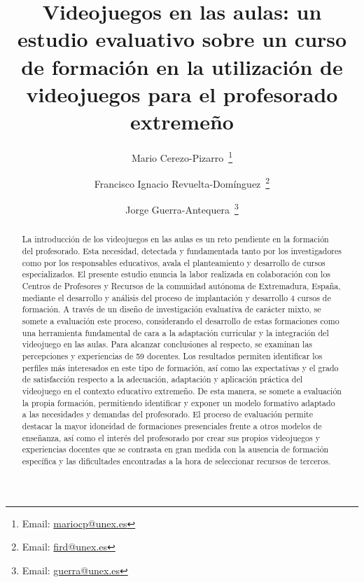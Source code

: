 \documentclass[spanish]{textolivre}
\title{Videojuegos en las aulas: un estudio evaluativo sobre un curso de formación en la utilización de videojuegos para el profesorado extremeño}
\author[1]{Mario Cerezo-Pizarro~\orcid{0000-0001-8097-0573}\thanks{Email: \href{mailto:mariocp@unex.es}{mariocp@unex.es}}}
\author[1]{Francisco Ignacio Revuelta-Domínguez~\orcid{0000-0002-3649-4327}\thanks{Email: \href{mailto:fird@unex.es}{fird@unex.es}}}
\author[1]{Jorge Guerra-Antequera~\orcid{0000-0003-1675-8038}\thanks{Email: \href{mailto:guerra@unex.es}{guerra@unex.es}}}
\affil[1]{Universidad de Extremadura, Extremadura, España.}
\begin{document}
\maketitle

\begin{polyabstract}
\begin{abstract}
La introducción de los videojuegos en las aulas es un reto pendiente en la formación del profesorado. Esta necesidad, detectada y fundamentada tanto por los investigadores como por los responsables educativos, avala el planteamiento y desarrollo de cursos especializados. El presente estudio enuncia la labor realizada en colaboración con los Centros de Profesores y Recursos de la comunidad autónoma de Extremadura, España, mediante el desarrollo y análisis del proceso de implantación y desarrollo 4 cursos de formación. A través de un diseño de investigación evaluativa de carácter mixto, se somete a evaluación este proceso, considerando el desarrollo de estas formaciones como una herramienta fundamental de cara a la adaptación curricular y la integración del videojuego en las aulas. Para alcanzar conclusiones al respecto, se examinan las percepciones y experiencias de 59 docentes. Los resultados permiten identificar los perfiles más interesados en este tipo de formación, así como las expectativas y el grado de satisfacción respecto a la adecuación, adaptación y aplicación práctica del videojuego en el contexto educativo extremeño. De esta manera, se somete a evaluación la propia formación, permitiendo identificar y exponer un modelo formativo adaptado a las necesidades y demandas del profesorado. El proceso de evaluación permite destacar la mayor idoneidad de formaciones presenciales frente a otros modelos de enseñanza, así como el interés del profesorado por crear sus propios videojuegos y experiencias docentes que se contrasta en gran medida con la ausencia de formación específica y las dificultades encontradas a la hora de seleccionar recursos de terceros.

\end{abstract}


\end{polyabstract}
\end{document}
